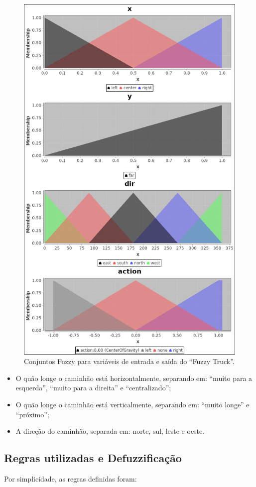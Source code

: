 \documentclass[twocolumn]{article}
\begin{document}
    \begin{figure}[ht]
        \centering{}
        \includegraphics[keepaspectratio,width=.5\textwidth]{img/truck-fuzzifiers}
        \caption{%
            Conjuntos Fuzzy para variáveis de entrada e saída do ``Fuzzy
            Truck''.\label{fuzzy-sets}
        }
    \end{figure}

    \begin{itemize}
        \item O quão longe o caminhão está horizontalmente, separando em:
            ``muito para a esquerda'', ``muito para a direita'' e
            ``centralizado'';
        \item O quão longe o caminhão está verticalmente, separando em: ``muito
            longe'' e ``próximo'';
        \item A direção do caminhão, separada em: norte, sul, leste e oeste.
    \end{itemize}

    \subsection{Regras utilizadas e Defuzzificação}

    Por simplicidade, as regras definidas foram:
\end{document}
